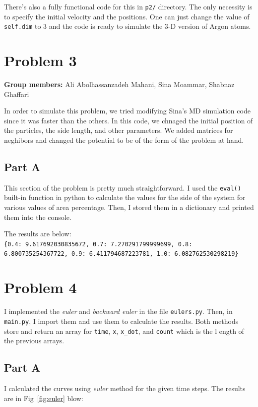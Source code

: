 \documentclass[12pt, a4paper]{article}
\begin{document}
	There's also a fully functional code for this in \texttt{p2/} directory. The only necessity is to specify the initial velocity and the positions. One can 
	just change the value of \texttt{self.dim} to $3$ and the code is ready to simulate the 3-D version of Argon atoms.

	\section{Problem 3}
	\textbf{Group members:} Ali Abolhassanzadeh Mahani, Sina Moammar, Shabnaz Ghaffari
	
	In order to simulate this problem, we tried modifying Sina's MD simulation code since it was faster than the others. In this code, we chnaged the 
	initial position of the particles, the side length, and other parameters. We added matrices for neghibors and changed the potential to be of 
	the form of the problem at hand. 
	\subsection{Part A}
	This section of the problem is pretty much straightforward. I used the \texttt{eval()} built-in function in python to calculate the values for 
	the side of the system for various values of area percentage. Then, I stored them in a dictionary and printed them into the console.
	
	The results are below:\\
	\texttt{\{0.4: 9.617692030835672, 0.7: 7.270291799999699, 0.8: 6.800735254367722, 0.9: 6.411794687223781, 1.0: 6.082762530298219\}}
	\section{Problem 4}
	I implemented the \emph{euler} and \emph{backward euler} in the file \texttt{eulers.py}. Then, in \texttt{main.py}, I import them and use them
	to calculate the results. Both methods store and return an array for \texttt{time}, \texttt{x}, \texttt{x\_dot}, and \texttt{count} which is the l
	ength of the previous arrays. 
	
	\subsection{Part A}
	I calculated the curves using \emph{euler} method for the given time steps. The results are in Fig~\ref{fig:euler} blow:
	
\end{document}
